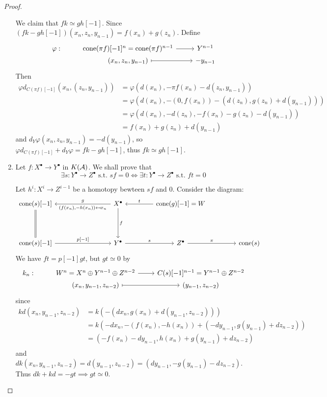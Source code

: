 \begin{theorem}
\begin{proof}
\begin{enumerate}
        We claim that $fk \simeq g h[-1]$. Since $(fk - gh[-1])(x_n, z_n, y_{n-1})
        = f(x_n) + g(z_n)$. Define
        \[ \begin{tikzcd}[row sep=0]
            \varphi: & \cone(\pi f)[-1]^n = \cone(\pi f)^{n-1} \ar[r] & Y^{n-1} \\
            & (x_n, z_n, y_{n-1}) \ar[r, mapsto] & -y_{n-1}
          \end{tikzcd} \]
        Then
        \begin{align*}
          \varphi d_{C(\pi f)[-1]}(x_n, (z_n, y_{n-1}))
          &= \varphi (d(x_n), - \pi f(x_n) - d(z_n, y_{n-1})) \\
          &= \varphi (d(x_n), - (0, f(x_n)) - (d(z_n), g(z_n) + d(y_{n-1}))) \\
          &= \varphi (d(x_n), - d(z_n),  - f(x_n) - g(z_n) - d(y_{n-1})) \\
          &= f(x_n) + g(z_n) + d(y_{n-1})
        \end{align*}
        and $d_Y \varphi(x_n, z_n, y_{n-1}) = -d(y_{n-1})$,
        so $\varphi d_{C(\pi f)[-1]} + d_Y \varphi = fk - gh[-1]$, thus
        $fk \simeq gh[-1]$.
      \item Let $f : X^\bullet \to Y^\bullet$ in $K(\mathcal{A})$. We shall prove that
        \[ \exists s: Y^\bullet \to Z^\bullet \text{ s.t. } sf = 0
          \iff \exists t: Y^\bullet \to Z^\bullet \text{ s.t. } ft = 0 \]

        Let $h^i : X^i \to Z^{i-1}$ be a homotopy bewteen $sf$ and $0$.
        Consider the diagram:
        \[ \begin{tikzcd}[column sep=1.5cm, row sep=1.5cm]
            \cone(s)[-1] \ar[rr, leftarrow, "g", "{(f(x_n), -h(x_n)) \mapsfrom x_n}"']
            \ar[d, equal] & &
            X^\bullet \ar[r, leftarrow, "t"] \ar[d, "f"] &
            \cone(g)[-1] = W & \\
            \cone(s)[-1] \ar[rr, "{p[-1]}"] & &
            Y^\bullet \ar[r, "s"] &
            Z^\bullet \ar[r, "\pi"] &
            \cone(s)
          \end{tikzcd} \]
        We have $ft = p[-1]gt$, but $gt \simeq 0$ by
        \[ \begin{tikzcd}[row sep=0]
            k_n: & W^n = X^n \oplus Y^{n-1} \oplus Z^{n-2} \ar[r]
            & C(s)[-1]^{n-1} = Y^{n-1} \oplus Z^{n-2} \\
            & (x_n, y_{n-1}, z_{n-2}) \ar[r, mapsto] & (y_{n-1}, z_{n-2})
          \end{tikzcd} \]
        since
        \begin{align*}
          k d (x_n, y_{n-1}, z_{n-2})
          &= k ( -(dx_n, g(x_n) + d(y_{n-1}, z_{n-2}))) \\
          &= k (- dx_n, - (f(x_n), -h(x_n)) + (-d y_{n-1}, g(y_{n-1}) + d z_{n-2})) \\
          &= (-f(x_n) - dy_{n-1}, h(x_n) + g(y_{n-1}) + d z_{n-2}) \\
        \end{align*}
        and $dk(x_n, y_{n-1}, z_{n-2}) = d(y_{n-1}, z_{n-2}) = (d y_{n-1}, -g(y_{n-1}) - d z_{n-2})$.
        Thus $dk + kd = -gt \implies gt \simeq 0$.


\end{enumerate}
\end{proof}
\end{theorem}
